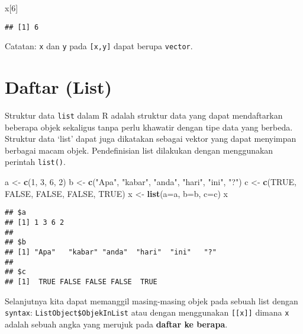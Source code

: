 \documentclass[
]{book}
\newenvironment{Shaded}{\begin{snugshade}}{\end{snugshade}}
\newcommand{\DataTypeTok}[1]{\textcolor[rgb]{0.13,0.29,0.53}{#1}}
\newcommand{\DecValTok}[1]{\textcolor[rgb]{0.00,0.00,0.81}{#1}}
\newcommand{\KeywordTok}[1]{\textcolor[rgb]{0.13,0.29,0.53}{\textbf{#1}}}
\newcommand{\NormalTok}[1]{#1}
\newcommand{\OtherTok}[1]{\textcolor[rgb]{0.56,0.35,0.01}{#1}}
\newcommand{\StringTok}[1]{\textcolor[rgb]{0.31,0.60,0.02}{#1}}
\begin{document}
\begin{Shaded}
\begin{Highlighting}[]
\NormalTok{x[}\DecValTok{6}\NormalTok{]}
\end{Highlighting}
\end{Shaded}

\begin{verbatim}
## [1] 6
\end{verbatim}

Catatan: \texttt{x} dan \texttt{y} pada \texttt{{[}x,y{]}} dapat berupa \texttt{vector}.

\hypertarget{list}{%
\section{Daftar (List)}\label{list}}

Struktur data \texttt{list} dalam R adalah struktur data yang dapat mendaftarkan beberapa objek sekaligus tanpa perlu khawatir dengan tipe data yang berbeda. Struktur data `list' dapat juga dikatakan sebagai vektor yang dapat menyimpan berbagai macam objek. Pendefinisian list dilakukan dengan menggunakan perintah \texttt{list()}.

\begin{Shaded}
\begin{Highlighting}[]
\NormalTok{a <-}\StringTok{ }\KeywordTok{c}\NormalTok{(}\DecValTok{1}\NormalTok{, }\DecValTok{3}\NormalTok{, }\DecValTok{6}\NormalTok{, }\DecValTok{2}\NormalTok{)}
\NormalTok{b <-}\StringTok{ }\KeywordTok{c}\NormalTok{(}\StringTok{"Apa"}\NormalTok{, }\StringTok{"kabar"}\NormalTok{, }\StringTok{"anda"}\NormalTok{, }\StringTok{"hari"}\NormalTok{, }\StringTok{"ini"}\NormalTok{, }\StringTok{"?"}\NormalTok{)}
\NormalTok{c <-}\StringTok{ }\KeywordTok{c}\NormalTok{(}\OtherTok{TRUE}\NormalTok{, }\OtherTok{FALSE}\NormalTok{, }\OtherTok{FALSE}\NormalTok{, }\OtherTok{FALSE}\NormalTok{, }\OtherTok{TRUE}\NormalTok{)}
\NormalTok{x <-}\StringTok{ }\KeywordTok{list}\NormalTok{(}\DataTypeTok{a=}\NormalTok{a, }\DataTypeTok{b=}\NormalTok{b, }\DataTypeTok{c=}\NormalTok{c)}
\NormalTok{x}
\end{Highlighting}
\end{Shaded}

\begin{verbatim}
## $a
## [1] 1 3 6 2
## 
## $b
## [1] "Apa"   "kabar" "anda"  "hari"  "ini"   "?"    
## 
## $c
## [1]  TRUE FALSE FALSE FALSE  TRUE
\end{verbatim}

Selanjutnya kita dapat memanggil masing-masing objek pada sebuah list dengan \texttt{syntax}: \texttt{ListObject\$ObjekInList} atau dengan menggunakan \texttt{{[}{[}x{]}{]}} dimana \texttt{x} adalah sebuah angka yang merujuk pada \textbf{daftar ke berapa}.
\end{document}
